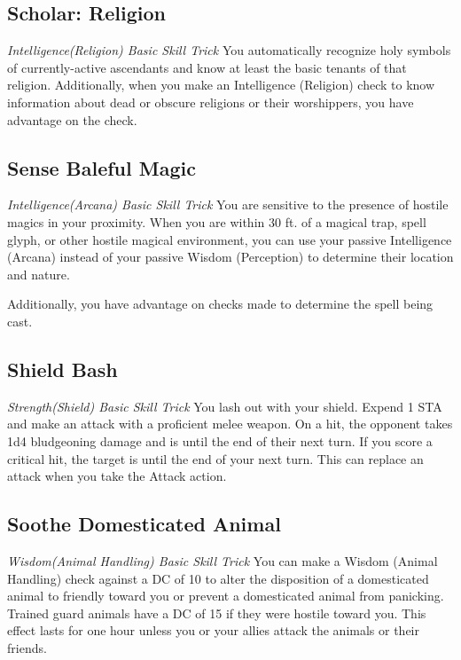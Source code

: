 \subsection{Scholar: Religion}\label{st:scholar-religion}
\textit{Intelligence(Religion) Basic Skill Trick}
You automatically recognize holy symbols of currently-active ascendants and know at least the basic tenants of that religion. Additionally, when you make an Intelligence (Religion) check to know information about dead or obscure religions or their worshippers, you have advantage on the check.

\subsection{Sense Baleful Magic}\label{st:sense-baleful-magic}
\textit{Intelligence(Arcana) Basic Skill Trick}
You are sensitive to the presence of hostile magics in your proximity. When you are within 30 ft. of a magical trap, spell glyph, or other hostile magical environment, you can use your passive Intelligence (Arcana) instead of your passive Wisdom (Perception) to determine their location and nature.

Additionally, you have advantage on checks made to determine the spell being cast.

\subsection{Shield Bash}
\textit{Strength(Shield) Basic Skill Trick}
You lash out with your shield. Expend 1 STA and make an attack with a proficient melee weapon. On a hit, the opponent takes 1d4 bludgeoning damage and is  until the end of their next turn. If you score a critical hit, the target is  until the end of your next turn. This can replace an attack when you take the Attack action.

\subsection{Soothe Domesticated Animal}\label{st:soothe-domesticated-animal}
\textit{Wisdom(Animal Handling) Basic Skill Trick}
You can make a Wisdom (Animal Handling) check against a DC of 10 to alter the disposition of a domesticated animal to friendly toward you or prevent a domesticated animal from panicking. Trained guard animals have a DC of 15 if they were hostile toward you. This effect lasts for one hour unless you or your allies attack the animals or their friends.

